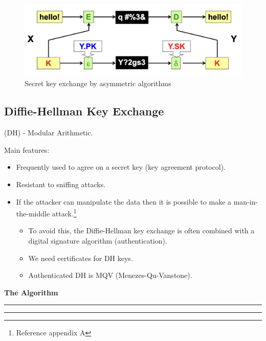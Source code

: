 \begin{figure}[H]
    \centering
    \includegraphics[width=0.7\linewidth]{Images/Cryptography/pk_exchange.png}
    \caption{Secret key exchange by asymmetric algorithms}
\end{figure}

\clearpage

\subsection{Diffie-Hellman Key Exchange}
\begin{center}
    (DH) - Modular Arithmetic.
\end{center}
Main features:
\begin{itemize}
    \item Frequently used to agree on a secret key (key agreement protocol).
    \item Resistant to sniffing attacks.
    \item If the attacker can manipulate the data then it is possible to make a man-in-the-middle attack.\footnote{Reference appendix A}
    \begin{itemize}
        \item To avoid this, the Diffie-Hellman key exchange is often combined with a digital signature algorithm (authentication).
        \item We need certificates for DH keys.
        \item Authenticated DH is MQV (Menezes-Qu-Vanstone).
    \end{itemize}
\end{itemize}

\begin{center}
    \textbf{The Algorithm}
\end{center}
\begin{multicols}{2}
    \begin{center}
        \vspace{0.2cm}
        \hrule
    \end{center}

\columnbreak
\columnseprule=1pt

    \begin{center}
        \vspace{0.2cm}
        \hrule
    \end{center}
    
\end{multicols}

